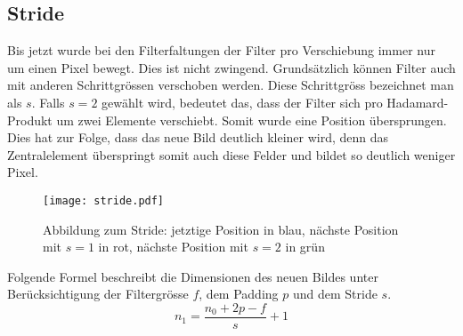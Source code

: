 \cite{deeplearning.ai:cnn}

\subsection{Stride}
Bis jetzt wurde bei den Filterfaltungen der Filter pro Verschiebung immer nur
um einen Pixel bewegt. Dies ist nicht zwingend. Grundsätzlich können Filter auch
mit anderen Schrittgrössen verschoben werden.
Diese Schrittgröss bezeichnet
man als  $s$. Falls $s = 2$ gewählt wird, bedeutet das, dass der
Filter sich pro Hadamard-Produkt um zwei Elemente verschiebt. Somit wurde eine
Position übersprungen. Dies hat zur Folge, dass das neue Bild
deutlich kleiner wird, denn das Zentralelement überspringt somit auch
diese Felder und bildet so deutlich weniger Pixel.
\para{}
\begin{figure}[h!]
  \centering
  \texttt{[image: stride.pdf]}
  \caption{Abbildung zum Stride: jetztige Position in blau, nächste Position mit
    $s=1$ in rot, nächste Position mit $s=2$ in grün}
\end{figure}
\para{}
Folgende Formel beschreibt die Dimensionen des neuen Bildes unter
Berücksichtigung der Filtergrösse $f$, dem Padding $p$ und dem Stride $s$.
\\
\begin{equation}
  n_1 = \frac{n_0 + 2p - f}{s} + 1
\end{equation}

\cite{deeplearning.ai:cnn}

